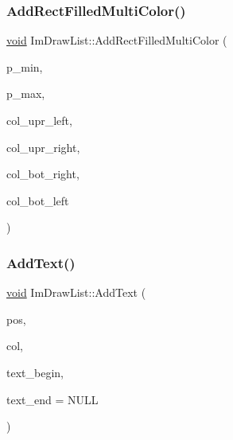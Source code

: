 \mbox{\label{structImDrawList_a6282e85ad78b01ebb74832336e9a2a55}} 
\subsubsection{\texorpdfstring{Add\+Rect\+Filled\+Multi\+Color()}{AddRectFilledMultiColor()}}
{\footnotesize\ttfamily \hyperlink{imgui__impl__opengl3__loader_8h_ac668e7cffd9e2e9cfee428b9b2f34fa7}{void} Im\+Draw\+List\+::\+Add\+Rect\+Filled\+Multi\+Color (\begin{DoxyParamCaption}\item[{const \hyperlink{structImVec2}{Im\+Vec2} \&}]{p\+\_\+min,  }\item[{const \hyperlink{structImVec2}{Im\+Vec2} \&}]{p\+\_\+max,  }\item[{Im\+U32}]{col\+\_\+upr\+\_\+left,  }\item[{Im\+U32}]{col\+\_\+upr\+\_\+right,  }\item[{Im\+U32}]{col\+\_\+bot\+\_\+right,  }\item[{Im\+U32}]{col\+\_\+bot\+\_\+left }\end{DoxyParamCaption})}

\mbox{\label{structImDrawList_ac5221bd86b3429f6d5b6e6ffe454942d}} 
\subsubsection{\texorpdfstring{Add\+Text()}{AddText()}\hspace{0.1cm}{\footnotesize\ttfamily [1/2]}}
{\footnotesize\ttfamily \hyperlink{imgui__impl__opengl3__loader_8h_ac668e7cffd9e2e9cfee428b9b2f34fa7}{void} Im\+Draw\+List\+::\+Add\+Text (\begin{DoxyParamCaption}\item[{const \hyperlink{structImVec2}{Im\+Vec2} \&}]{pos,  }\item[{Im\+U32}]{col,  }\item[{const char $\ast$}]{text\+\_\+begin,  }\item[{const char $\ast$}]{text\+\_\+end = {\ttfamily NULL} }\end{DoxyParamCaption})}

